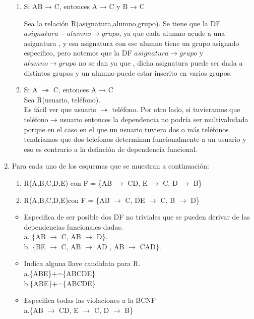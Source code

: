 \documentclass[a4paper, 12pt]{report}
\begin{document}
\begin{enumerate}
{\begin{enumerate}
	\item Si AB → C, entonces A → C y B → C


	Sea la relación R(asignatura,alumno,grupo).
	Se tiene que la DF $asignatura-alumno \rightarrow grupo$, ya que cada alumno acude a una asignatura , y esa asignatura con ese alumno tiene un grupo asignado especifico, pero notemos que la DF $asignatura \rightarrow grupo$ y $alumno \rightarrow grupo$ no se dan ya que , dicha asignatura puede ser dada a distintos grupos y un alumno puede estar inscrito en varios grupos.

    \item Si A $\twoheadrightarrow$ C, entonces A → C\\

        Sea R(usuario, teléfono).\\
        Es fácil ver que usuario $\twoheadrightarrow$ teléfono. Por otro lado,
        si tuvieramos que teléfono → usuario entonces la dependencia no podría
        ser multivaludada porque en el caso en el que un usuario tuviera dos o
        más teléfonos tendríamos que dos telefonos determinan funcionalmente a
        un usuario y eso es contrario a la definción de dependencia funcional.
\end{enumerate}}
\item Para cada uno de los esquemas que se muestran a continuación:
\begin{enumerate}
	\item R(A,B,C,D,E) con F = \{AB $\rightarrow$ CD, E $\rightarrow$ C, D
		$\rightarrow$ B\}
	\item R(A,B,C,D,E)con F = \{AB $\rightarrow$ C, DE $\rightarrow$ C, B $\rightarrow$ D\}
\end{enumerate}
\begin{itemize}
	\item Especifica de  ser  posible dos DF  no  triviales que  se  pueden
	derivar  de  las  dependencias funcionales dadas.\\
	a. \{AB $\rightarrow$ C, AB $\rightarrow$ D\}.\\
	b. \{BE $\rightarrow$ C, AB $\rightarrow$ AD , AB $\rightarrow$ CAD\}.

	\item Indica alguna llave candidata para R.\\
	a.\{ABE\}+=\{ABCDE\}\\
	b.\{ABE\}+=\{ABCDE\}

	\item Especifica todas las violaciones a la BCNF\\
	a.\{AB $\rightarrow$ CD, E $\rightarrow$ C, D
	$\rightarrow$ B\}


\end{itemize}
\end{enumerate}
\end{document}
